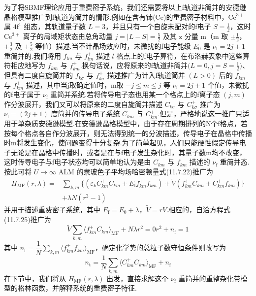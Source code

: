为了将SBMF理论应用于重费密子系统，我们还需要将以上f轨道非简并的安德逊晶格模型推广到f轨道为简并的情形.例如在含有铈(Ce)的重费密子材料中，$\mathrm{Ce}^{3+}$ 属 $4\mathrm{f}^{1}$ 组态，其轨道量子数 $L=3$，并且只有一个自旋未配对的f电子 $S=\frac{1}{2}$，这时 $\mathrm{Ce}^{3+}$ 离子的局域矩状态由总角动量 $j=|L-S|=\frac{5}{2}$ 及其 z 分量 m（m 取 $\pm\frac{1}{2}$，$\pm\frac{3}{2}$ 及 $\pm\frac{5}{2}$ 等值）描述.当不计晶场效应时，未微扰的f电子能级 $E_{0}$ 是 $\nu_{\mathrm{f}}=2j+1$ 重简并的.我们将用 $f_{lm}$ 与 $f_{lm}^{+}$ 描述 $l$ 格点上的f电子算符，在布洛赫表象中这些算符相应地写为 $f_{km}$ 与 $f_{km}^{+}$.换句话说，应将原来的f轨道非简并$\bigl(L=0,j=S=\frac{1}{2}\bigr)$、但具有二度自旋简并的 $f_{k\sigma}$ 与 $f_{k\sigma}^{+}$ 描述推广为计入f轨道简并 $(L>0)$ 后的 $f_{km}$ 与 $f_{km}^{+}$ 描述，其中当j取确定值时，m取 $-j\leqslant m\leqslant j$ 等 $\nu_{\mathrm{f}}=2j+1$ 个值，未微扰的f电子属于 $\nu_{\mathrm{f}}$ 重简并系统.若将传导电子态也用某一个格点上的f离子态 $(j,m)$ 作分波展开，我们又可以将原来的二度自旋简并描述 $C_{k\sigma}$ 与 $C_{k\sigma}^{+}$ 推广为 $\nu_{\mathrm{f}}=(2j+1)$ 度简并的传导电子系统 $C_{km}$ 与 $C_{km}^{+}$.但是，严格地说这一推广只适用于单杂质安德逊模型.在安德逊晶格模型中，由于存在周期排列的N个f格点，若按每个格点各自作分波展开，则无法得到统一的分波描述，传导电子在晶格中传播时m将发生变化，使问题变得十分复杂.为了简单起见，人们只能硬性假定传导电子无论是在晶格中传播时，或者是在与f电子发生杂化时，其量子数m均不改变，这时传导电子与f电子状态均可以简单地认为是由 $C_{km}$ 与 $f_{km}$ 描述的 $\nu_{\mathrm{f}}$ 重简并态.按此可将 $U\to\infty$ ALM 的隶玻色子平均场哈密顿量式(11.7.22)推广为
\begin{equation}
\begin{aligned}
  H_{\mathrm{MF}}(r,\lambda)={}&\sum_{k,m}\bigl\{(\varepsilon_{k}C_{km}^{+}C_{km}
  +E_{\mathrm{f}}f_{km}^{+}f_{km})
  +\widetilde{V}(f_{km}^{+}C_{km}+C_{km}^{+}f_{km})\bigr\}\\
  &+\lambda N(r^{2}-1)
\end{aligned}
\end{equation}
并用于描述重费密子系统，其中 $E_{\mathrm{f}}=E_{0}+\lambda$，$\widetilde{V}=rV$.相应的，自洽方程式(11.7.25)推广为
\begin{subequations}
\begin{equation}
  \widetilde{V}\sum_{k,m}\langle f_{km}^{+}C_{km}\rangle_{\mathrm{MF}}+N\lambda r^{2}=0
\end{equation}
\begin{equation}
  r^{2}+n_{\mathrm{f}}=1
\end{equation}
\end{subequations}
其中 $n_{\mathrm{f}}=\dfrac{1}{N}\sum\limits_{k,m}\langle f_{km}^{+}f_{km}\rangle_{\mathrm{MF}}$，确定化学势的总粒子数守恒条件则改写为
\begin{equation}
  n_{\mathrm{t}}=\frac{1}{N}\sum_{k,m}\langle C_{km}^{+}C_{km}\rangle_{\mathrm{MF}}+n_{\mathrm{f}}
\end{equation}
在下节中，我们将从 $H_{\mathrm{MF}}(r,\lambda)$ 出发，直接求解这个 $\nu_{\mathrm{f}}$ 重简并的重整杂化带模型的格林函数，并解释系统的重费密子特征.

